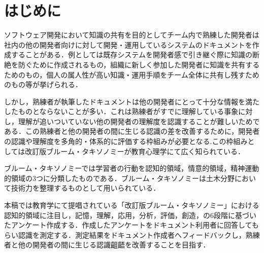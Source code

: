 \section{はじめに}
ソフトウェア開発において知識の共有を目的としてチーム内で熟練した開発者は社内の他の開発者向けに対して開発・運用しているシステムのドキュメントを作成することがある．例としては既存システムを開発者感で引き継ぐ際に知識の断絶を防ぐために作成されるもの，組織に新しく参加した開発者に知識を共有するためのもの，個人の属人性が高い知識・運用手順をチーム全体に共有し残すためのもの等が挙げられる．

しかし，熟練者が執筆したドキュメントは他の開発者にとって十分な情報を満たしたものとならないことが多い．これは熟練者がすでに理解している事象に対し，理解が追いついていない他の開発者の理解度を認識することが難しいためである．この熟練者と他の開発者の間に生じる認識の差を改善するために，開発者の認識や理解度を多角的・体系的に評価する枠組みが必要となる.この枠組みとしては改訂版ブルーム・タキソノミーが教育心理学にて広く知られている\cite{bib:nakao}．

ブルーム・タキソノミーでは学習者の行動を認知的領域，情意的領域，精神運動的領域の3つに分類したものである．ブルーム・タキソノミーは土木分野において技術力を整理するものとして用いられている．\cite{bib:miyahara}

本稿では教育学にて提唱されている「改訂版ブルーム・タキソノミー」における認知的領域に注目し，記憶，理解，応用，分析，評価，創造，の6段階に基づいたアンケート作成する．作成したアンケートをドキュメント利用者に回答してもらい認識を測定する．測定結果をドキュメント作成者へフィードバックし，熟練者と他の開発者の間に生じる認識齟齬を改善することを目指す．
